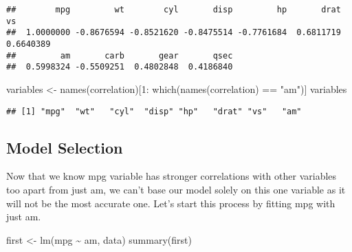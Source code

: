 \documentclass[
]{article}
\newenvironment{Shaded}{\begin{snugshade}}{\end{snugshade}}
\newcommand{\DecValTok}[1]{\textcolor[rgb]{0.00,0.00,0.81}{#1}}
\newcommand{\FunctionTok}[1]{\textcolor[rgb]{0.00,0.00,0.00}{#1}}
\newcommand{\NormalTok}[1]{#1}
\newcommand{\OtherTok}[1]{\textcolor[rgb]{0.56,0.35,0.01}{#1}}
\newcommand{\SpecialCharTok}[1]{\textcolor[rgb]{0.00,0.00,0.00}{#1}}
\newcommand{\StringTok}[1]{\textcolor[rgb]{0.31,0.60,0.02}{#1}}
\begin{document}
\begin{Shaded}
\end{Shaded}

\begin{verbatim}
##        mpg         wt        cyl       disp         hp       drat         vs 
##  1.0000000 -0.8676594 -0.8521620 -0.8475514 -0.7761684  0.6811719  0.6640389 
##         am       carb       gear       qsec 
##  0.5998324 -0.5509251  0.4802848  0.4186840
\end{verbatim}

\begin{Shaded}
\begin{Highlighting}[]
\NormalTok{variables }\OtherTok{\textless{}{-}} \FunctionTok{names}\NormalTok{(correlation)[}\DecValTok{1}\SpecialCharTok{:} \FunctionTok{which}\NormalTok{(}\FunctionTok{names}\NormalTok{(correlation) }\SpecialCharTok{==} \StringTok{"am"}\NormalTok{)]}
\NormalTok{variables}
\end{Highlighting}
\end{Shaded}

\begin{verbatim}
## [1] "mpg"  "wt"   "cyl"  "disp" "hp"   "drat" "vs"   "am"
\end{verbatim}

\hypertarget{model-selection}{%
\subsection{Model Selection}\label{model-selection}}

Now that we know mpg variable has stronger correlations with other
variables too apart from just am, we can't base our model solely on this
one variable as it will not be the most accurate one. Let's start this
process by fitting mpg with just am.

\begin{Shaded}
\begin{Highlighting}[]
\NormalTok{first }\OtherTok{\textless{}{-}} \FunctionTok{lm}\NormalTok{(mpg }\SpecialCharTok{\textasciitilde{}}\NormalTok{ am, data)}
\FunctionTok{summary}\NormalTok{(first)}
\end{Highlighting}
\end{Shaded}
\end{document}
